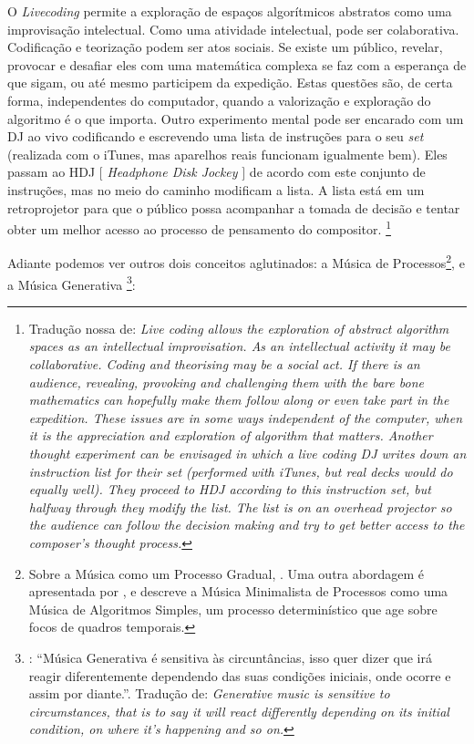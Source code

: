 \begin{citacao}
O \emph{Livecoding} permite a exploração de espaços algorítmicos abstratos como uma improvisação intelectual. Como uma atividade intelectual, pode ser colaborativa. Codificação e teorização podem ser atos sociais. Se existe um público, revelar, provocar e desafiar eles com uma matemática complexa se faz com a esperança de que sigam, ou até mesmo participem da expedição. Estas questões são, de certa forma, independentes do computador, quando a valorização e exploração do algoritmo é o que importa. Outro experimento mental pode ser encarado com um DJ ao vivo codificando e escrevendo uma lista de instruções para o seu \emph{set} (realizada com o iTunes, mas aparelhos reais funcionam igualmente bem). Eles passam ao HDJ $[$ \emph{Headphone Disk Jockey} $]$ de acordo com este conjunto de instruções, mas no meio do caminho modificam a lista. A lista está em um retroprojetor para que o público possa acompanhar a tomada de decisão e tentar obter um melhor acesso ao processo de pensamento do compositor. \cite[p.~245]{ward_live_2004} \footnote{Tradução nossa de: \emph{Live coding allows the exploration of abstract algorithm spaces as an intellectual improvisation. As an intellectual activity it may be collaborative. Coding and theorising may be a social act. If there is an audience, revealing, provoking and challenging them with the bare bone mathematics can hopefully make them follow along or even take part in the expedition. These issues are in some ways independent of the computer, when it is the appreciation and exploration of algorithm that matters.   Another thought experiment can be envisaged in which a live coding DJ writes down an instruction list for their set (performed with iTunes, but real decks would do equally well). They proceed to HDJ according to this instruction set, but halfway through they modify the list. The list is on an overhead projector so the audience can follow the decision making and try to get better access to the composer’s thought process.}}
\end{citacao}

Adiante podemos ver outros dois conceitos aglutinados: a Música de Processos\footnote{Sobre a Música como um Processo Gradual, . Uma outra abordagem é apresentada por , e descreve a Música Minimalista de Processos como uma Música de Algoritmos Simples,  um processo determinístico que age sobre focos de quadros temporais.}, e a Música Generativa \footnote{: ``Música Generativa é sensitiva às circuntâncias, isso quer dizer que irá reagir diferentemente dependendo das suas condições iniciais, onde ocorre e assim por diante.''. Tradução de: \emph{Generative music is sensitive to circumstances, that is to say it will react differently depending on its initial condition, on where it's happening and so on.}}:

